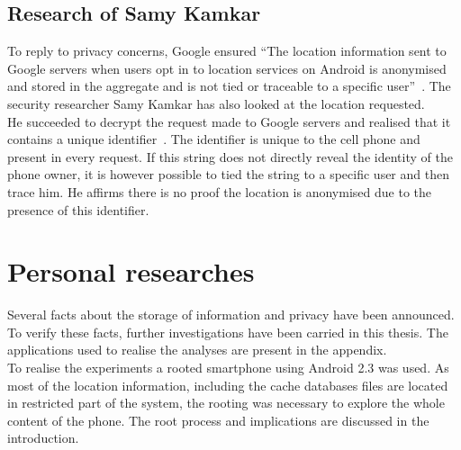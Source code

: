 \subsection{Research of Samy Kamkar}
\label{sec:andro-samy}

To reply to privacy concerns, Google ensured ``The location information sent to Google servers when users opt in to location services on Android is anonymised and stored in the aggregate and is not tied or traceable to a specific user''~\cite{loc-not-traceable}.
The security researcher Samy Kamkar has also looked at the location requested.\\


He succeeded to decrypt the request made to Google servers and realised that it contains a unique identifier~\cite{cnet-andr-samy}.
The identifier is unique to the cell phone and present in every request.
If this string does not directly reveal the identity of the phone owner, it is however possible to tied the string to a specific user and then trace him.
He affirms there is no proof the location is anonymised due to the presence of this identifier.\\

\section{Personal researches}
\label{sec:andro-perso-research}

Several facts about the storage of information and privacy have been announced.
To verify these facts, further investigations have been carried in this thesis.
The applications used to realise the analyses are present in the appendix.\\

To realise the experiments a rooted smartphone using Android 2.3 was used.
As most of the location information, including the cache databases files are located in restricted part of the system, the rooting was necessary to explore the whole content of the phone.
The root process and implications are discussed in the introduction.

